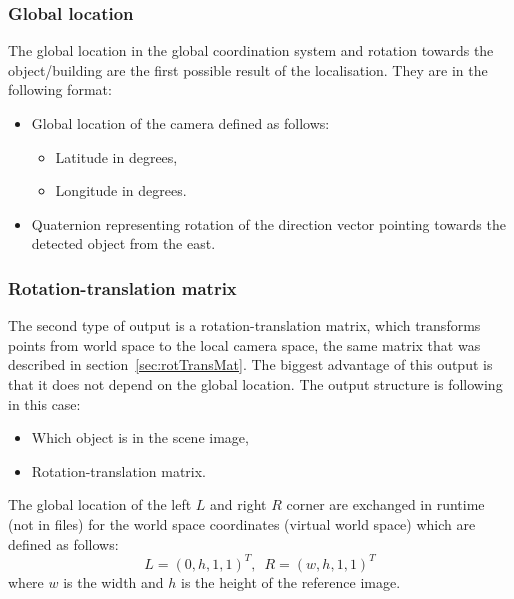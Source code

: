 \documentclass[thesis=B,english]{FITthesis}[2019/12/23]
\begin{document}
            \subsubsection*{Global location }
                The global location in the global coordination system and rotation towards the object/building are the first possible result of the localisation. They are in the following format:
                \begin{itemize}
                    \item Global location of the camera defined as follows:
                    \begin{itemize}
                        \item Latitude in degrees,
                        \item Longitude in degrees.
                    \end{itemize}
                    \item Quaternion representing rotation of the direction vector pointing towards the detected object from the east.
                \end{itemize}
            
            \subsubsection*{Rotation-translation matrix}

                The second type of output is a rotation-translation matrix, which transforms points from world space to the local camera space, the same matrix that was described in section~\ref{sec:rotTransMat}. The biggest advantage of this output is that it does not depend on the global location. The output structure is following in this case:
                \begin{itemize}
                    \item Which object is in the scene image,
                    \item Rotation-translation matrix.
                \end{itemize}
                The global location of the left \(L\) and right \(R\) corner are exchanged in runtime (not in files) for the world space coordinates (virtual world space) which are defined as follows:
                \begin{equation}
                    L = (0, h, 1, 1)^T, \enspace
                    R = (w, h, 1, 1)^T
                    \label{eq:3DImagePlaneCorners}
                \end{equation}
                where \(w\) is the width and \(h\) is the height of the reference image.
                
\end{document}
